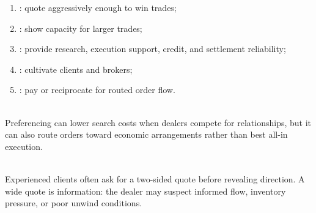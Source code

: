 \begin{taxonomy} 
\begin{enumerate}[label=\roman*.]
\setlength{\itemsep}{0pt}
\item {}: quote aggressively enough to win trades;
\item {}: show capacity for larger trades;
\item {}: provide research, execution support, credit, and settlement reliability;
\item {}: cultivate clients and brokers;
\item {}: pay or reciprocate for routed order flow.
\end{enumerate}
\end{taxonomy}

\begin{caveat} \\
Preferencing can lower search costs when dealers compete for relationships, but it can also route orders toward economic arrangements rather than best all-in execution.
\end{caveat}

\begin{practitionernote} \\
Experienced clients often ask for a two-sided quote before revealing direction. A wide quote is information: the dealer may suspect informed flow, inventory pressure, or poor unwind conditions.
\end{practitionernote}
